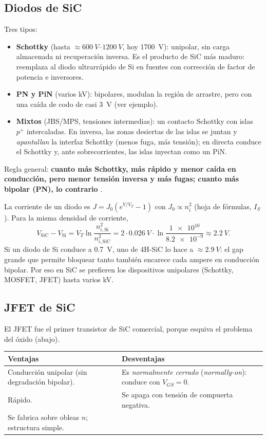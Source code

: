 \subsection{Diodos de SiC}

 Tres tipos:
\begin{itemize}
  \item \textbf{Schottky} (hasta $\approx\SIrange{600}{1200}{V}$, hoy \SI{1700}{V}): unipolar, sin
  carga almacenada ni recuperación inversa. Es el producto de SiC más maduro: reemplaza al diodo
  ultrarrápido de Si en fuentes con corrección de factor de potencia e inversores.
  \item \textbf{PN y PiN} (varios kV): bipolares, modulan la región de arrastre, pero con una caída
  de codo de casi \SI{3}{V} (ver ejemplo).
  \item \textbf{Mixtos} (JBS/MPS, tensiones intermedias): un contacto Schottky con islas $p^+$
  intercaladas. En inversa, las zonas desiertas de las islas se juntan y \emph{apantallan} la
  interfaz Schottky (menos fuga, más tensión); en directa conduce el Schottky y, ante sobrecorrientes,
  las islas inyectan como un PiN.
\end{itemize}
Regla general: \textbf{cuanto más Schottky, más rápido y menor caída en conducción, pero menor tensión
inversa y más fugas; cuanto más bipolar (PN), lo contrario} .

\begin{ejemplo}
La corriente de un diodo es $J=J_0(e^{V/V_T}-1)$ con $J_0\propto n_i^2$ (hoja de fórmulas,
$I_S$ \enhojatexto). Para la misma densidad de corriente,
\[
  V_{\mathrm{SiC}}-V_{\mathrm{Si}}=V_T\ln\frac{n_{i,\mathrm{Si}}^2}{n_{i,\mathrm{SiC}}^2}
  =2\cdot\SI{0.026}{V}\cdot\ln\frac{\num{1e10}}{\num{8.2e-9}}\approx\SI{2.2}{V}.
\]
Si un diodo de Si conduce a \SI{0.7}{V}, uno de 4H-SiC lo hace a $\approx\SI{2.9}{V}$: el gap grande
que permite bloquear tanto también encarece cada ampere en conducción bipolar. Por eso en SiC se
prefieren los dispositivos unipolares (Schottky, MOSFET, JFET) hasta varios kV.
\end{ejemplo}

\subsection{JFET de SiC}

 El JFET fue el primer transistor de SiC comercial, porque esquiva el problema del óxido
(abajo).
\begin{center}\small
\begin{tabularx}{0.95\textwidth}{XX}
\toprule
\textbf{Ventajas} & \textbf{Desventajas} \\
\midrule
Conducción unipolar (sin degradación bipolar). & Es \emph{normalmente cerrado} (\emph{normally-on}):
conduce con $V_{GS}=0$. \\
Rápido. & Se apaga con tensión de compuerta negativa. \\
Se fabrica sobre obleas $n$; estructura simple. & \\
\bottomrule
\end{tabularx}
\end{center}

